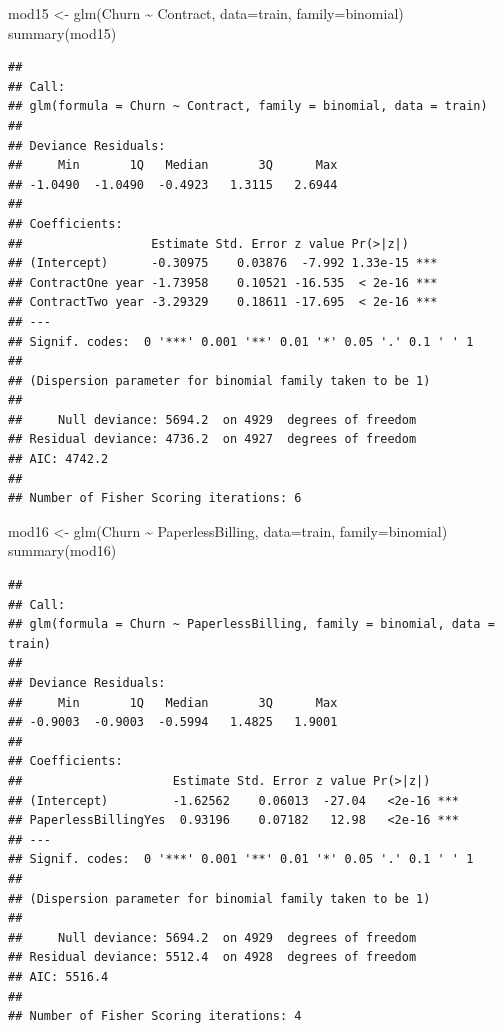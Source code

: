 \documentclass[
  twoside]{article}
\newenvironment{Shaded}{\begin{snugshade}}{\end{snugshade}}
\newcommand{\AttributeTok}[1]{\textcolor[rgb]{0.77,0.63,0.00}{#1}}
\newcommand{\FunctionTok}[1]{\textcolor[rgb]{0.00,0.00,0.00}{#1}}
\newcommand{\NormalTok}[1]{#1}
\newcommand{\OtherTok}[1]{\textcolor[rgb]{0.56,0.35,0.01}{#1}}
\newcommand{\SpecialCharTok}[1]{\textcolor[rgb]{0.00,0.00,0.00}{#1}}
\begin{document}
\begin{Shaded}
\begin{Highlighting}[]
\NormalTok{mod15 }\OtherTok{\textless{}{-}} \FunctionTok{glm}\NormalTok{(Churn }\SpecialCharTok{\textasciitilde{}}\NormalTok{ Contract, }\AttributeTok{data=}\NormalTok{train, }\AttributeTok{family=}\NormalTok{binomial)}
\FunctionTok{summary}\NormalTok{(mod15)}
\end{Highlighting}
\end{Shaded}

\begin{verbatim}
## 
## Call:
## glm(formula = Churn ~ Contract, family = binomial, data = train)
## 
## Deviance Residuals: 
##     Min       1Q   Median       3Q      Max  
## -1.0490  -1.0490  -0.4923   1.3115   2.6944  
## 
## Coefficients:
##                  Estimate Std. Error z value Pr(>|z|)    
## (Intercept)      -0.30975    0.03876  -7.992 1.33e-15 ***
## ContractOne year -1.73958    0.10521 -16.535  < 2e-16 ***
## ContractTwo year -3.29329    0.18611 -17.695  < 2e-16 ***
## ---
## Signif. codes:  0 '***' 0.001 '**' 0.01 '*' 0.05 '.' 0.1 ' ' 1
## 
## (Dispersion parameter for binomial family taken to be 1)
## 
##     Null deviance: 5694.2  on 4929  degrees of freedom
## Residual deviance: 4736.2  on 4927  degrees of freedom
## AIC: 4742.2
## 
## Number of Fisher Scoring iterations: 6
\end{verbatim}

\begin{Shaded}
\begin{Highlighting}[]
\NormalTok{mod16 }\OtherTok{\textless{}{-}} \FunctionTok{glm}\NormalTok{(Churn }\SpecialCharTok{\textasciitilde{}}\NormalTok{ PaperlessBilling, }\AttributeTok{data=}\NormalTok{train, }\AttributeTok{family=}\NormalTok{binomial)}
\FunctionTok{summary}\NormalTok{(mod16)}
\end{Highlighting}
\end{Shaded}

\begin{verbatim}
## 
## Call:
## glm(formula = Churn ~ PaperlessBilling, family = binomial, data = train)
## 
## Deviance Residuals: 
##     Min       1Q   Median       3Q      Max  
## -0.9003  -0.9003  -0.5994   1.4825   1.9001  
## 
## Coefficients:
##                     Estimate Std. Error z value Pr(>|z|)    
## (Intercept)         -1.62562    0.06013  -27.04   <2e-16 ***
## PaperlessBillingYes  0.93196    0.07182   12.98   <2e-16 ***
## ---
## Signif. codes:  0 '***' 0.001 '**' 0.01 '*' 0.05 '.' 0.1 ' ' 1
## 
## (Dispersion parameter for binomial family taken to be 1)
## 
##     Null deviance: 5694.2  on 4929  degrees of freedom
## Residual deviance: 5512.4  on 4928  degrees of freedom
## AIC: 5516.4
## 
## Number of Fisher Scoring iterations: 4
\end{verbatim}
\end{document}
